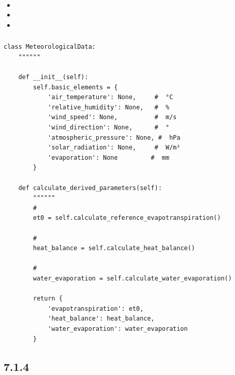 \hypertarget{section-65}{%
\paragraph{}\label{section-65}}

\begin{itemize}
\item
  \important{}
\item
  \important{}
\item
  \important{}
\end{itemize}

\hypertarget{section-66}{%
\subsubsection{}\label{section-66}}

\hypertarget{section-67}{%
\paragraph{}\label{section-67}}

\begin{lstlisting}[style=python]
class MeteorologicalData:
    """"""
    
    def __init__(self):
        self.basic_elements = {
            'air_temperature': None,     #  °C
            'relative_humidity': None,   #  %
            'wind_speed': None,          #  m/s
            'wind_direction': None,      #  °
            'atmospheric_pressure': None, #  hPa
            'solar_radiation': None,     #  W/m²
            'evaporation': None         #  mm
        }
    
    def calculate_derived_parameters(self):
        """"""
        # 
        et0 = self.calculate_reference_evapotranspiration()
        
        # 
        heat_balance = self.calculate_heat_balance()
        
        # 
        water_evaporation = self.calculate_water_evaporation()
        
        return {
            'evapotranspiration': et0,
            'heat_balance': heat_balance,
            'water_evaporation': water_evaporation
        }
\end{lstlisting}

\hypertarget{section-68}{%
\subsection{7.1.4}\label{section-68}}


